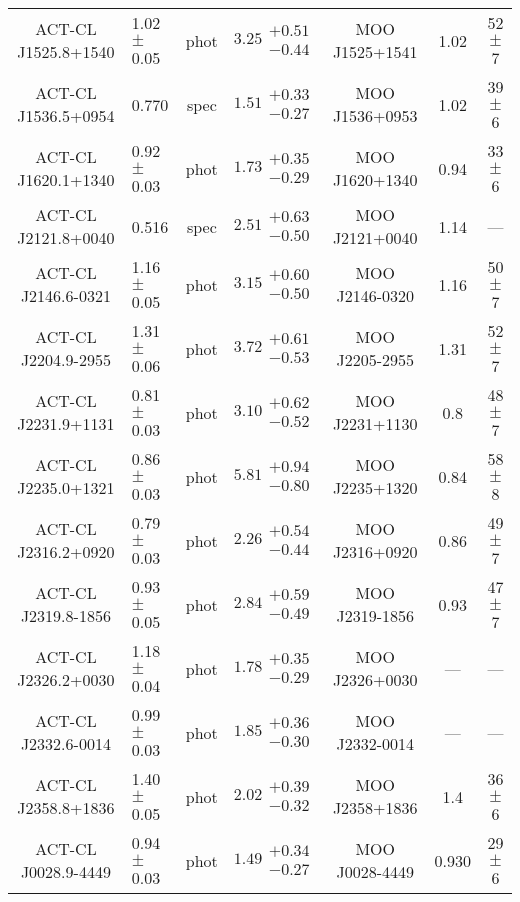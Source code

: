 \begin{longtable}[p!]{clccccc}
ACT-CL J1525.8+1540 & 1.02$\pm$ 0.05 & phot & $3.25\substack{+0.51\\-0.44}$ & MOO J1525+1541 & 1.02 & 52$\pm$ 7 \\
ACT-CL J1536.5+0954 & 0.770& spec & $1.51\substack{+0.33\\-0.27}$ & MOO J1536+0953 & 1.02 & 39$\pm$ 6 \\
ACT-CL J1620.1+1340 & 0.92$\pm$ 0.03 & phot & $1.73\substack{+0.35\\-0.29}$ & MOO J1620+1340 & 0.94 & 33$\pm$ 6 \\
ACT-CL J2121.8+0040 & 0.516& spec & $2.51\substack{+0.63\\-0.50}$ & MOO J2121+0040 & 1.14 & ---\\
ACT-CL J2146.6-0321 & 1.16$\pm$ 0.05 & phot & $3.15\substack{+0.60\\-0.50}$ & MOO J2146-0320 & 1.16 & 50$\pm$ 7 \\
ACT-CL J2204.9-2955 & 1.31$\pm$ 0.06 & phot & $3.72\substack{+0.61\\-0.53}$ & MOO J2205-2955 & 1.31 & 52$\pm$ 7 \\
ACT-CL J2231.9+1131 & 0.81$\pm$ 0.03 & phot & $3.10\substack{+0.62\\-0.52}$ & MOO J2231+1130 & 0.8 & 48$\pm$ 7 \\
ACT-CL J2235.0+1321 & 0.86$\pm$ 0.03 & phot & $5.81\substack{+0.94\\-0.80}$ & MOO J2235+1320 & 0.84 & 58$\pm$ 8 \\
ACT-CL J2316.2+0920 & 0.79$\pm$ 0.03 & phot & $2.26\substack{+0.54\\-0.44}$ & MOO J2316+0920 & 0.86 & 49$\pm$ 7 \\
ACT-CL J2319.8-1856 & 0.93$\pm$ 0.05 & phot & $2.84\substack{+0.59\\-0.49}$ & MOO J2319-1856 & 0.93 & 47$\pm$ 7 \\
ACT-CL J2326.2+0030 & 1.18$\pm$ 0.04 & phot & $1.78\substack{+0.35\\-0.29}$ & MOO J2326+0030 & --- & ---\\
ACT-CL J2332.6-0014 & 0.99$\pm$ 0.03 & phot & $1.85\substack{+0.36\\-0.30}$ & MOO J2332-0014 & --- & ---\\
ACT-CL J2358.8+1836 & 1.40$\pm$ 0.05 & phot & $2.02\substack{+0.39\\-0.32}$ & MOO J2358+1836 & 1.4 & 36$\pm$ 6 \\
ACT-CL J0028.9-4449 & 0.94$\pm$ 0.03 & phot & $1.49\substack{+0.34\\-0.27}$ & MOO J0028-4449 & 0.930 & 29$\pm$ 6 \\

\end{longtable}
